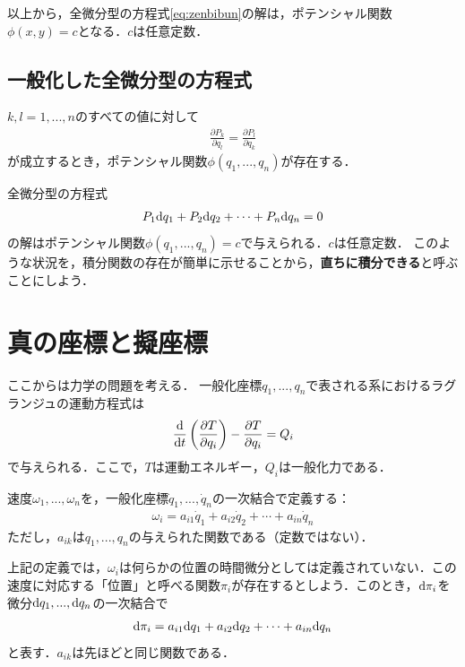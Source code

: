\documentclass[a4j,10pt]{jsarticle}
\newcommand{\bbn}[2]{\frac{{\rm {\rm d}} #1}{{\rm {\rm d}} #2}}
\begin{document}
以上から，全微分型の方程式\eqref{eq:zenbibun}の解は，ポテンシャル関数$\phi(x,y)=c$となる．$c$は任意定数．

\subsection{一般化した全微分型の方程式}
$k,l=1,...,n$のすべての値に対して
\begin{align}
    \frac{\partial P_k}{\partial q_l} = \frac{\partial P_l}{\partial q_k}    
\end{align}
が成立するとき，ポテンシャル関数$\phi(q_1,...,q_n)$が存在する．

全微分型の方程式
\begin{align}
    P_1 {\rm d} q_1 + P_2 {\rm d} q_2 + \cdots + P_n {\rm d} q_n=0
\end{align}
の解はポテンシャル関数$\phi(q_1,...,q_n)=c$で与えられる．$c$は任意定数．
このような状況を，積分関数の存在が簡単に示せることから，\textbf{直ちに積分できる}と呼ぶことにしよう．

\section{真の座標と擬座標}
ここからは力学の問題を考える．
一般化座標$q_1,...,q_n$で表される系におけるラグランジュの運動方程式は
\begin{align}
    \bbn{}{t}\left(\frac{\partial T}{\partial q_i}\right)-\frac{\partial T}{\partial q_i}=Q_i
    \label{eq:Lagrange_equation}
\end{align}
で与えられる．ここで，$T$は運動エネルギー，$Q_i$は一般化力である．

速度$\omega_1,...,\omega_n$を，一般化座標$\dot{q}_1,...,\dot{q}_n$の一次結合で定義する：
\begin{align}
    \omega_i = a_{i1}\dot{q}_1 + a_{i2}\dot{q}_2+\cdots+a_{in}\dot{q}_n
    \label{eq:omega_definition}
\end{align}
ただし，$a_{ik}$は$q_1,...,q_n$の与えられた関数である（定数ではない）．

上記の定義では，$\omega_i$は何らかの位置の時間微分としては定義されていない．この速度に対応する「位置」と呼べる関数$\pi_i$が存在するとしよう．このとき，${\rm d} \pi_i$を微分${\rm d} q_1, ... ,{\rm d} q_n$の一次結合で
\begin{align}
    {\rm d}\pi_i = a_{i1}{\rm d} q_1 + a_{i2}{\rm d} q_2 + \cdots + a_{in}{\rm d} q_n
    \label{eq:derivative_of_pi}
\end{align}
と表す．$a_{ik}$は先ほどと同じ関数である．
\end{document}
